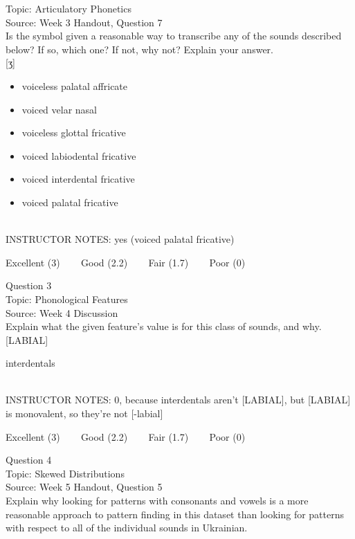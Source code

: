 \documentclass[12pt]{article}
\begin{document}
Topic: Articulatory Phonetics\\
Source: Week 3 Handout, Question 7\\

Is the symbol given a reasonable way to transcribe any of the sounds described below? If so, which one? If not, why not? Explain your answer.\\

{[ʒ]}

\begin{itemize} \item voiceless palatal affricate \item voiced velar nasal \item voiceless glottal fricative \item voiced labiodental fricative \item voiced interdental fricative \item voiced palatal fricative \end{itemize}


~\\
INSTRUCTOR NOTES: yes (voiced palatal fricative)


\vfill
Excellent (3) ~~~ Good (2.2) ~~~ Fair (1.7) ~~~ Poor (0)
\newpage

{\large Question 3}\\

Topic: Phonological Features\\
Source: Week 4 Discussion\\

Explain what the given feature’s value is for this class of sounds, and why.\\

{[LABIAL]}

interdentals


~\\
INSTRUCTOR NOTES: 0, because interdentals aren't [LABIAL], but [LABIAL] is monovalent, so they're not [-labial]


\vfill
Excellent (3) ~~~ Good (2.2) ~~~ Fair (1.7) ~~~ Poor (0)
\newpage

{\large Question 4}\\

Topic: Skewed Distributions\\
Source: Week 5 Handout, Question 5\\

Explain why looking for patterns with consonants and vowels is a more reasonable approach to pattern finding in this dataset than looking for patterns with respect to all of the individual sounds in Ukrainian.\\
\end{document}
